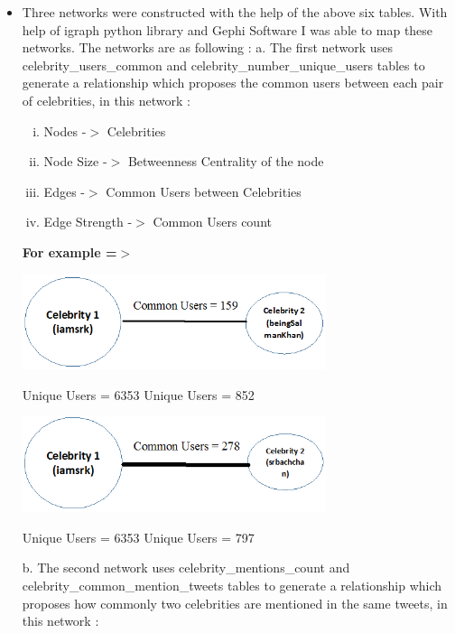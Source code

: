 \documentclass[runningheads,a4paper]{llncs}
\begin{document}
\begin{itemize}
\item	Three networks were constructed with the help of the above six tables. With help of igraph python library and Gephi Software I was able to map these networks. The networks are as following : 
\vspace{0.1in}
\subitem	a. The first network uses celebrity\_users\_common and celebrity\_number\_unique\_users tables to generate a relationship which proposes the common users between each pair of celebrities, in this network :
\vspace{0.1in}
\begin{enumerate}[i.  ]
\addtolength{\itemindent}{1cm}
\item Nodes -$>$ Celebrities
\item Node Size -$>$ Betweenness Centrality of the node
\item Edges -$>$ Common Users between Celebrities
\item Edge Strength -$>$ Common Users count
\end{enumerate}
\vspace{0.1in}
\textbf{For example =$>$}
\begin{flushleft}
\centerline{\includegraphics[width=0.7\textwidth,height=0.5\textheight,keepaspectratio]{common_users_eg_1.png}}
\centerline{Unique Users = 6353 \hspace{2cm} Unique Users = 852}
\vspace{0.2in}
\centerline{\includegraphics[width=0.7\textwidth,height=0.5\textheight,keepaspectratio]{common_users_eg_2.png}}
\centerline{Unique Users = 6353 \hspace{2cm} Unique Users = 797}
\end{flushleft}
\subitem b. The second network uses celebrity\_mentions\_count and celebrity\_common\_mention\_tweets tables to generate a relationship which proposes how commonly two celebrities are mentioned in the same tweets, in this network :

\end{itemize}
\end{document}

